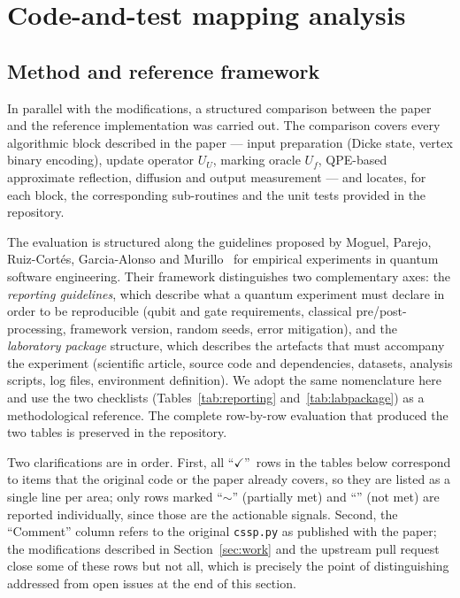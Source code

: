 \documentclass[11pt,a4paper]{article}
\begin{document}
\section{Code-and-test mapping analysis}
\label{sec:mapping}

\subsection{Method and reference framework}

In parallel with the modifications, a structured comparison
between the paper and the reference implementation was carried
out. The comparison covers every algorithmic block described in
the paper --- input preparation (Dicke state, vertex binary
encoding), update operator $U_U$, marking oracle $U_f$,
QPE-based approximate reflection, diffusion and output
measurement --- and locates, for each block, the corresponding
sub-routines and the unit tests provided in the repository.

The evaluation is structured along the guidelines proposed by
Moguel, Parejo, Ruiz-Cort\'es, Garcia-Alonso and
Murillo~\cite{moguel2024} for empirical experiments in quantum
software engineering. Their framework distinguishes two
complementary axes: the \emph{reporting guidelines}, which
describe what a quantum experiment must declare in order to be
reproducible (qubit and gate requirements, classical
pre/post-processing, framework version, random seeds, error
mitigation), and the \emph{laboratory package} structure, which
describes the artefacts that must accompany the experiment
(scientific article, source code and dependencies, datasets,
analysis scripts, log files, environment definition). We adopt
the same nomenclature here and use the two checklists
(Tables~\ref{tab:reporting} and~\ref{tab:labpackage}) as a
methodological reference. The complete row-by-row evaluation
that produced the two tables is preserved in the repository.

Two clarifications are in order. First, all
``$\checkmark$''~rows in the tables below correspond to items
that the original code or the paper already covers, so they are
listed as a single line per area; only rows marked ``$\sim$''
(partially met) and ``'' (not met) are reported
individually, since those are the actionable signals. Second,
the ``Comment'' column refers to the original \texttt{cssp.py}
as published with the paper; the modifications described in
Section~\ref{sec:work} and the upstream pull request close some
of these rows but not all, which is precisely the point of
distinguishing addressed from open issues at the end of this
section.
\end{document}
